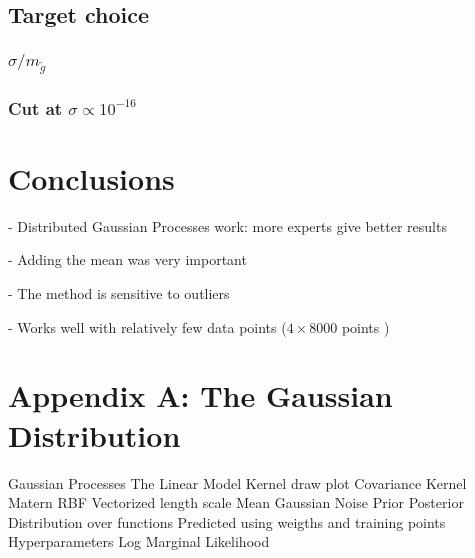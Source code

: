 \documentclass[twoside,english]{uiofysmaster}
\begin{document}
\section{Target choice}

\subsection{$\sigma / m_{\tilde{g}}$}

\subsection{Cut at $\sigma \propto 10^{-16}$}

\chapter{Conclusions}

- Distributed Gaussian Processes work: more experts give better results

- Adding the mean was very important

- The method is sensitive to outliers

- Works well with relatively few data points ($4 \times 8000$ points )


\chapter{Appendix A: The Gaussian Distribution}




\pagebreak

Gaussian Processes
The Linear Model 
Kernel draw plot 
Covariance
Kernel 
Matern 
RBF
Vectorized length scale 
Mean 
Gaussian Noise
Prior
Posterior
Distribution over functions
Predicted using weigths and training points 
Hyperparameters
Log Marginal Likelihood









\end{document}
